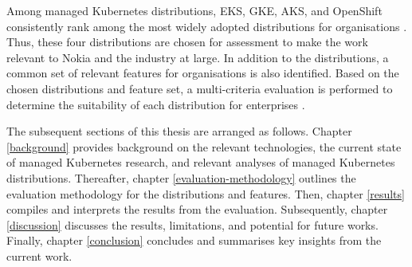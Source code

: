 Among managed Kubernetes distributions, EKS, GKE, AKS, and OpenShift consistently rank among the most widely adopted distributions for organisations \cite{redhatinc.StateKubernetesSecurity2024, canonicalKubernetesCloudNative2022, portworxKubernetesAdoptionSurvey2021, broadcomStateKubernetes20232023}. Thus, these four distributions are chosen for assessment to make the work relevant to Nokia and the industry at large. In addition to the distributions, a common set of relevant features for organisations is also identified. Based on the chosen distributions and feature set, a multi-criteria evaluation is performed to determine the suitability of each distribution for enterprises \cite{5976164}.

The subsequent sections of this thesis are arranged as follows. Chapter \ref{background} provides background on the relevant technologies, the current state of managed Kubernetes research, and relevant analyses of managed Kubernetes distributions. Thereafter, chapter \ref{evaluation-methodology} outlines the evaluation methodology for the distributions and features. Then, chapter \ref{results} compiles and interprets the results from the evaluation. Subsequently, chapter \ref{discussion} discusses the results, limitations, and potential for future works. Finally, chapter \ref{conclusion} concludes and summarises key insights from the current work.




